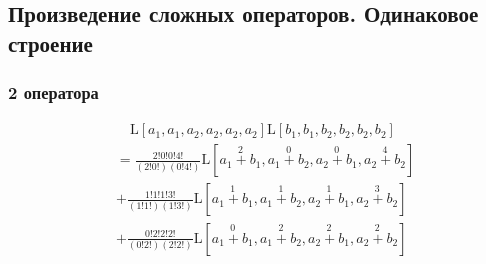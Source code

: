 
\subsection{Произведение сложных операторов. Одинаковое строение}

\subsubsection{2 оператора}

\begin{equation*} \begin{aligned}
& \quad
  \mathrm{L}[a_1, a_1, a_2, a_2, a_2, a_2]
  \mathrm{L}[b_1, b_1, b_2, b_2, b_2, b_2] \\ &=
  \frac{2!0!0!4!}{(2!0!)(0!4!)}
  \mathrm{L}\left[
  \stackrel{2}{a_1 + b_1},
  \stackrel{0}{a_1 + b_2},
  \stackrel{0}{a_2 + b_1},
  \stackrel{4}{a_2 + b_2}
  \right] \\ &
+ \frac{1!1!1!3!}{(1!1!)(1!3!)}
  \mathrm{L}\left[
  \stackrel{1}{a_1 + b_1},
  \stackrel{1}{a_1 + b_2},
  \stackrel{1}{a_2 + b_1},
  \stackrel{3}{a_2 + b_2}
  \right] \\ &
+ \frac{0!2!2!2!}{(0!2!)(2!2!)}
  \mathrm{L}\left[
  \stackrel{0}{a_1 + b_1},
  \stackrel{2}{a_1 + b_2},
  \stackrel{2}{a_2 + b_1},
  \stackrel{2}{a_2 + b_2}
  \right] \\ &
\end{aligned} \end{equation*}